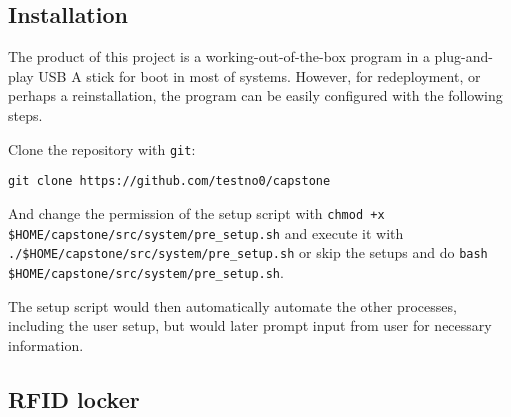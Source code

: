 \documentclass[12pt]{article}
\begin{document}
\subsection*{Installation}

The product of this project is a working-out-of-the-box program in a plug-and-play USB A stick for boot in most of systems. However, for redeployment, or perhaps a reinstallation, the program can be easily configured with the following steps.

Clone the repository with \texttt{git}:

\begin{lstlisting}
git clone https://github.com/testno0/capstone
\end{lstlisting}

And change the permission of the setup script with \texttt{chmod +x \$HOME/capstone/src/system/pre\_setup.sh} and execute it with \texttt{./\$HOME/capstone/src/system/pre\_setup.sh} or skip the setups and do \texttt{bash \$HOME/capstone/src/system/pre\_setup.sh}.

The setup script would then automatically automate the other processes, including the user setup, but would later prompt input from user for necessary information.

\subsection*{RFID locker}
\end{document}
